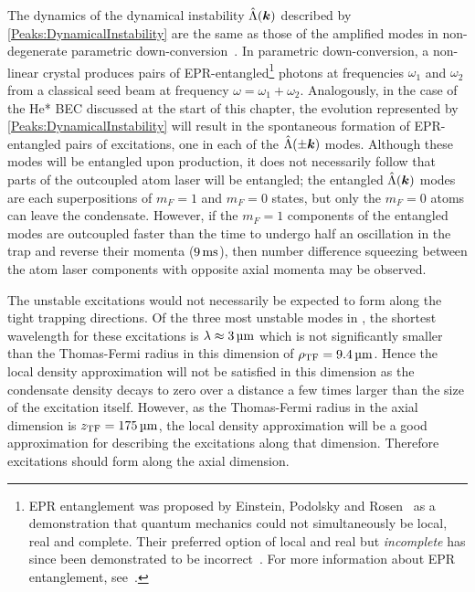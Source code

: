 The dynamics of the dynamical instability $\hat{\Lambda}(\bm{k})$ described by \eqref{Peaks:DynamicalInstability} are the same as those of the amplified modes in non-degenerate parametric down-conversion~\citep{WallsMilburn}.  In parametric down-conversion, a non-linear crystal produces pairs of EPR-entangled\footnote{EPR entanglement was proposed by Einstein, Podolsky and Rosen~\citep{Einstein:1935} as a demonstration that quantum mechanics could not simultaneously be local, real and complete.  Their preferred option of local and real but \emph{incomplete} has since been demonstrated to be incorrect~\citep{Aspect:1982uq}.  For more information about EPR entanglement, see~\citep[Chapter 18]{Scully}.} photons at frequencies $\omega_1$ and $\omega_2$ from a classical seed beam at frequency $\omega = \omega_1 + \omega_2$.  Analogously, in the case of the He* BEC discussed at the start of this chapter, the evolution represented by \eqref{Peaks:DynamicalInstability} will result in the spontaneous formation of EPR-entangled pairs of excitations, one in each of the $\hat{\Lambda}(\pm \bm{k})$ modes. Although these modes will be entangled upon production, it does not necessarily follow that parts of the outcoupled atom laser will be entangled; the entangled $\hat{\Lambda}(\bm{k})$ modes are each superpositions of $m_F=1$ and $m_F=0$ states, but only the $m_F=0$ atoms can leave the condensate. However, if the $m_F=1$ components of the entangled modes are outcoupled faster than the time to undergo half an oscillation in the trap and reverse their momenta ($\unit[9]{ms}$), then number difference squeezing between the atom laser components with opposite axial momenta may be observed.

The unstable excitations would not necessarily be expected to form along the tight trapping directions. Of the three most unstable modes in , the shortest wavelength for these excitations is $\lambda \approx \unit[3]{\micro m}$ which is not significantly smaller than the Thomas-Fermi radius in this dimension of $\rho_\text{TF} = \unit[9.4]{\micro m}$. Hence the local density approximation will not be satisfied in this dimension as the condensate density decays to zero over a distance a few times larger than the size of the excitation itself.  However, as the Thomas-Fermi radius in the axial dimension is $z_\text{TF} = \unit[175]{\micro m}$, the local density approximation will be a good approximation for describing the excitations along that dimension. Therefore excitations should form along the axial dimension.

